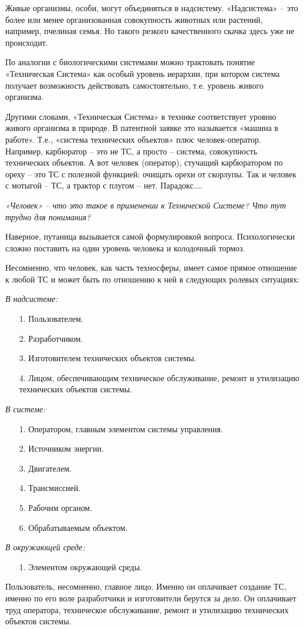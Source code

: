 \documentclass[11pt,a4paper]{article}
\begin{document}
Живые организмы, особи, могут объединяться в надсистему. «Надсистема» – это
более или менее организованная совокупность животных или растений, например,
пчелиная семья. Но такого резкого качественного скачка здесь уже не
происходит.


По аналогии с биологическими системами можно трактовать понятие «Техническая
Система» как особый уровень иерархии, при котором система получает возможность
действовать самостоятельно, т.е. уровень живого организма.


Другими словами, «Техническая Система» в технике соответствует уровню живого
организма в природе. В патентной заявке это называется «машина в
работе». Т.е., «система технических объектов» плюс человек-оператор. Например,
карбюратор – это не ТС, а просто – система, совокупность технических
объектов. А вот человек (оператор), стучащий карбюратором по ореху – это ТС с
полезной функцией: очищать орехи от скорлупы. Так и человек с мотыгой – ТС, а
трактор с плугом – нет. Парадокс....

\emph{«Человек» – что это такое в применении к Технической Системе? Что тут трудно
для понимания? }

Наверное, путаница вызывается самой формулировкой вопроса. Психологически
сложно поставить на один уровень человека и колодочный тормоз.

Несомненно, что человек, как часть техносферы, имеет самое прямое отношение к
любой ТС и может быть по отношению к ней в следующих ролевых ситуациях:

\emph{В надсистеме:} 
\begin{itemize}
\item[1.] Пользователем. 
\item[2.] Разработчиком. 
\item[3.] Изготовителем технических объектов системы. 
\item[4.] Лицом, обеспечивающим техническое обслуживание, ремонт и утилизацию
  технических объектов системы.  
\end{itemize}
\emph{В системе:} 
\begin{itemize}
\item[1.] Оператором, главным элементом системы управления. 
\item[2.] Источником энергии. 
\item[3.] Двигателем. 
\item[4.] Трансмиссией. 
\item[5.] Рабочим органом. 
\item[6.] Обрабатываемым объектом. 
\end{itemize}
\emph{В окружающей среде:} 
\begin{itemize}
\item[1.] Элементом окружающей среды. 
\end{itemize}
Пользователь, несомненно, главное лицо. Именно он оплачивает создание ТС,
именно по его воле разработчики и изготовители берутся за дело. Он оплачивает
труд оператора, техническое обслуживание, ремонт и утилизацию технических
объектов системы.
\end{document}
